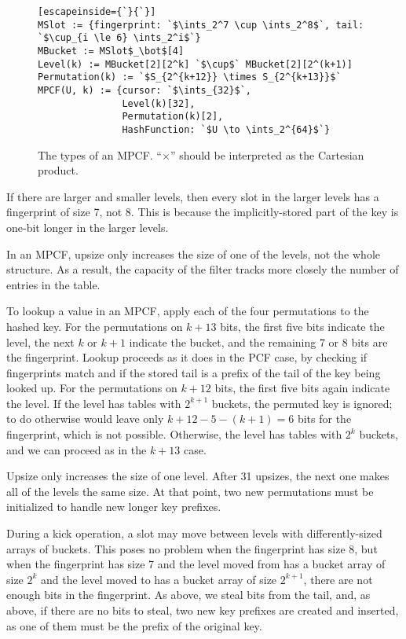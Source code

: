 \documentclass[letterpaper, 11pt]{article}
\newcommand{\ints}{\mathbb{Z}}
\begin{document}
\begin{figure}
\begin{lstlisting}[escapeinside={`}{`}]
MSlot := {fingerprint: `$\ints_2^7 \cup \ints_2^8$`, tail: `$\cup_{i \le 6} \ints_2^i$`}
MBucket := MSlot$_\bot$[4]
Level(k) := MBucket[2][2^k] `$\cup$` MBucket[2][2^(k+1)]
Permutation(k) := `$S_{2^{k+12}} \times S_{2^{k+13}}$`
MPCF(U, k) := {cursor: `$\ints_{32}$`,
               Level(k)[32],
               Permutation(k)[2],
               HashFunction: `$U \to \ints_2^{64}$`}

\end{lstlisting}
\caption{The types of an MPCF.
``$\times$'' should be interpreted as the Cartesian product.
}
\end{figure}

If there are larger and smaller levels, then every slot in the larger levels has a fingerprint of size 7, not 8.
This is because the implicitly-stored part of the key is one-bit longer in the larger levels.

In an MPCF, upsize only increases the size of one of the levels, not the whole structure.
As a result, the capacity of the filter tracks more closely the number of entries in the table.

To lookup a value in an MPCF, apply each of the four permutations to the hashed key.
For the permutations on $k + 13$ bits, the first five bits indicate the level, the next $k$ or $k+1$ indicate the bucket, and the remaining 7 or 8 bits are the fingerprint.
Lookup proceeds as it does in the PCF case, by checking if fingerprints match and if the stored tail is a prefix of the tail of the key being looked up.
For the permutations on $k + 12$ bits, the first five bits again indicate the level.
If the level has tables with $2^{k+1}$ buckets, the permuted key is ignored; to do otherwise would leave only $k+12 - 5 - (k+1) = 6$ bits for the fingerprint, which is not possible.
Otherwise, the level has tables with $2^k$ buckets, and we can proceed as in the $k+13$ case.


Upsize only increases the size of one level.
After 31 upsizes, the next one makes all of the levels the same size.
At that point, two new permutations must be initialized to handle new longer key prefixes.

During a kick operation, a slot may move between levels with differently-sized arrays of buckets.
This poses no problem when the fingerprint has size 8, but when the fingerprint has size 7 and the level moved from has a bucket array of size $2^k$ and the level moved to has a bucket array of size $2^{k+1}$,  there are not enough bits in the fingerprint.
As above, we steal bits from the tail, and, as above, if there are no bits to steal, two new key prefixes are created and inserted, as one of them must be the prefix of the original key.
\end{document}
